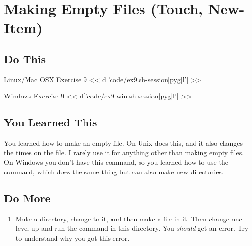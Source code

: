 \chapter{Making Empty Files (Touch, New-Item)}

\section{Do This}

\begin{code}{Linux/Mac OSX Exercise 9}
<< d['code/ex9.sh-session|pyg|l'] >>
\end{code}

\begin{code}{Windows Exercise 9}
<< d['code/ex9-win.sh-session|pyg|l'] >>
\end{code}

\section{You Learned This}

You learned how to make an empty file.  On Unix  does this, and
it also changes the times on the file.  I rarely use it for anything other than
making empty files.  On Windows you don't have this command, so you learned
how to use the  command, which does the same thing but can
also make new directories.

\section{Do More}

\begin{enumerate}
\item Make a directory, change to it, and then make a file in it.  Then change
    one level up and run the  command in this directory.  You
    \emph{should} get an error.  Try to understand why you got this error.
\end{enumerate}

